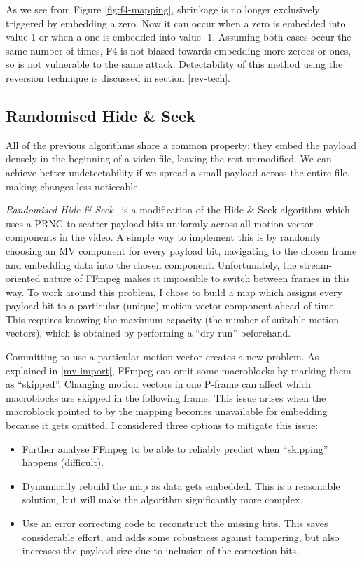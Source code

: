 \documentclass[12pt,british,twoside,notitlepage,usenames,dvipsnames,hypens,final]{report}
\numberwithin{equation}{section}
\numberwithin{figure}{section}
\begin{document}
As we see from Figure \ref{fig:f4-mapping}, shrinkage is no longer exclusively triggered by embedding a zero. Now it can occur when a zero is embedded into value 1 or when a one is embedded into value -1. Assuming both cases occur the same number of times, F4 is not biased towards embedding more zeroes or ones, so is not vulnerable to the same attack. Detectability of this method using the reversion technique is discussed in section \ref{rev-tech}.

\subsection{Randomised Hide \& Seek}
\label{rand-hidenseek}

All of the previous algorithms share a common property: they embed the payload densely in the beginning of a video file, leaving the rest unmodified. We can achieve better undetectability if we spread a small payload across the entire file, making changes less noticeable. 

\emph{Randomised Hide \& Seek}~\cite{bateman} is a modification of the Hide \& Seek algorithm which uses a PRNG to scatter payload bits uniformly across all motion vector components in the video. A simple way to implement this is by randomly choosing an MV component for every payload bit, navigating to the chosen frame and embedding data into the chosen component. Unfortunately, the stream-oriented nature of FFmpeg makes it impossible to switch between frames in this way. To work around this problem, I chose to build a map which assigns every payload bit to a particular (unique) motion vector component ahead of time. This requires knowing the maximum capacity (the number of suitable motion vectors), which is obtained by performing a ``dry run'' beforehand. 

Committing to use a particular motion vector creates a new problem. As explained in \ref{mv-import}, FFmpeg can omit some macroblocks by marking them as ``skipped''. Changing motion vectors in one P-frame can affect which macroblocks are skipped in the following frame. This issue arises when the macroblock pointed to by the mapping becomes unavailable for embedding because it gets omitted. I considered three options to mitigate this issue:
\begin{itemize}
\item Further analyse FFmpeg to be able to reliably predict when ``skipping'' happens  (difficult).
\item Dynamically rebuild the map as data gets embedded. This is a reasonable solution, but will make the algorithm significantly more complex.
\item Use an error correcting code to reconstruct the missing bits. This saves considerable effort, and adds some robustness against tampering, but also increases the payload size due to inclusion of the correction bits.
\end{itemize}
\end{document}

